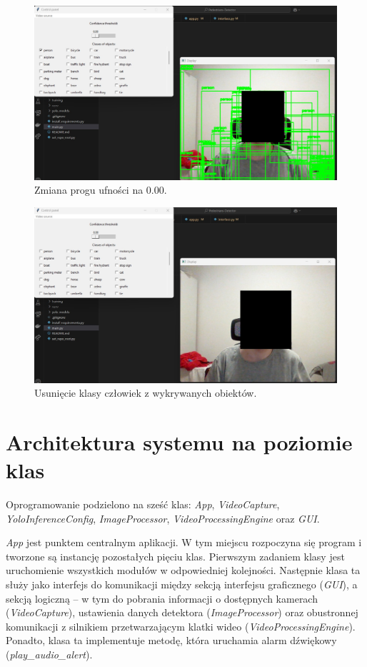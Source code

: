 \begin{figure}[H]
    \centering
    \includegraphics[width=\linewidth]{r_implementacja/panel_sterowania/camera_0.jpg}
    \caption{Zmiana progu ufności na 0.00.}
    \label{fig:mockup-4}
\end{figure}

\begin{figure}[H]
    \centering
    \includegraphics[width=\linewidth]{r_implementacja/panel_sterowania/camera_no_person.jpg}
    \caption{Usunięcie klasy człowiek z wykrywanych obiektów.}
    \label{fig:mockup-5}
\end{figure}


\section{Architektura systemu na poziomie klas}
Oprogramowanie podzielono na sześć klas: \emph{App}, \emph{VideoCapture}, \emph{YoloInferenceConfig}, \emph{ImageProcessor}, \emph{VideoProcessingEngine} oraz \emph{GUI}.

\emph{App} jest punktem centralnym aplikacji. W tym miejscu rozpoczyna się program i tworzone są instancję pozostałych pięciu klas. Pierwszym zadaniem klasy jest uruchomienie wszystkich modułów w odpowiedniej kolejności. Następnie klasa ta służy jako interfejs do komunikacji między sekcją interfejsu graficznego (\emph{GUI}), a sekcją logiczną -- w tym do pobrania informacji o dostępnych kamerach (\emph{VideoCapture}), ustawienia danych detektora (\emph{ImageProcessor}) oraz obustronnej komunikacji z silnikiem przetwarzającym klatki wideo (\emph{VideoProcessingEngine}). 
Ponadto, klasa ta implementuje metodę, która uruchamia alarm dźwiękowy (\emph{{play\_audio\_alert}}). 

